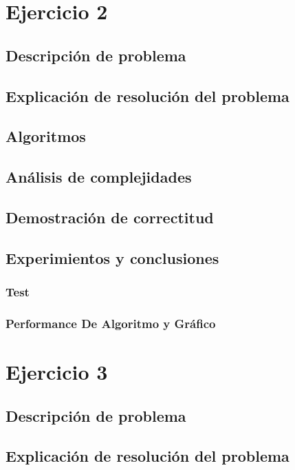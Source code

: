 \documentclass[12pt, a4paper]{article}
\begin{document}
\newpage
\section{Ejercicio 2} 
\subsection{Descripci\'on de problema}

\subsection{Explicaci\'on de resoluci\'on del problema}

\subsection{Algoritmos}

\subsection{An\'alisis de complejidades}

\subsection{Demostraci\'on de correctitud}

\subsection{Experimientos y conclusiones}
\subsubsection[2.5]{Test}

\subsubsection[2.5]{Performance De Algoritmo y Gr\'afico}
%

\newpage
\section{Ejercicio 3} 
\subsection{Descripci\'on de problema}

\subsection{Explicaci\'on de resoluci\'on del problema}

\end{document}
